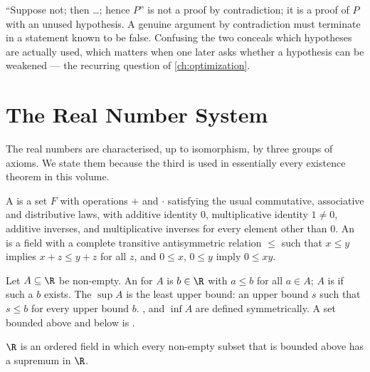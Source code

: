 \begin{remark}\label{rem:proof-error}
	``Suppose not; then \dots; hence $P$'' is not a proof by contradiction; it is a
	proof of $P$ with an unused hypothesis. A genuine argument by contradiction must
	terminate in a statement known to be false. Confusing the two conceals which
	hypotheses are actually used, which matters when one later asks whether a
	hypothesis can be weakened --- the recurring question of
	\autoref{ch:optimization}.
\end{remark}

\section{The Real Number System}\label{sec:sets-reals}

The real numbers are characterised, up to isomorphism, by three groups of
axioms. We state them because the third is used in essentially every existence
theorem in this volume.

\begin{definition}\label{def:ordered-field}
	A  is a set $F$ with operations $+$ and $\cdot$ satisfying the usual
	commutative, associative and distributive laws, with additive identity $0$,
	multiplicative identity $1\neq0$, additive inverses, and multiplicative inverses
	for every element other than $0$. An  is a field with a
	complete transitive antisymmetric relation $\leq$ such that $x\leq y$ implies
	$x+z\leq y+z$ for all $z$, and $0\leq x$, $0\leq y$ imply $0\leq xy$.
\end{definition}

\begin{definition}\label{def:sup-inf}
	Let $A\subseteq\R$ be non-empty. An  for $A$ is $b\in\R$ with
	$a\leq b$ for all $a\in A$; $A$ is  if such
	a $b$ exists. The  $\sup A$ is the least upper bound: an upper
	bound $s$ such that $s\leq b$ for every upper bound $b$. ,
	 and  $\inf A$ are defined
	symmetrically. A set bounded above and below is .
\end{definition}

\begin{assumption}\label{ass:completeness-axiom}
	$\R$ is an ordered field in which every non-empty subset that is bounded above
	has a supremum in $\R$.
\end{assumption}


